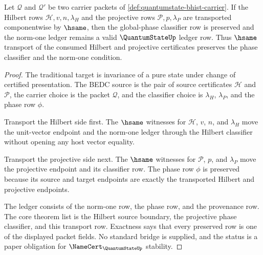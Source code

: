 \begin{theorem}
\label{thm:quantumstate-global-phase-stability}
Let $\mathcal{Q}$ and $\mathcal{Q}'$ be two carrier packets of
\autoref{def:quantumstate-bhist-carrier}. If the Hilbert rows
$\mathcal{H},v,n,\lambda_H$ and the projective rows
$\mathcal{P},p,\lambda_P$ are transported componentwise by $\hsame$, then the
global-phase classifier row is preserved and the norm-one ledger remains a
valid $\QuantumStateUp$ ledger row. Thus $\hsame$ transport of the consumed
Hilbert and projective certificates preserves the phase classifier and the
norm-one condition.
\end{theorem}
\begin{proof}
The traditional target is invariance of a pure state under change of certified
presentation. The BEDC source is the pair of source certificates
$\mathcal{H}$ and $\mathcal{P}$, the carrier choice is the packet
$\mathcal{Q}$, and the classifier choice is $\lambda_H$, $\lambda_P$, and the
phase row $\phi$.

Transport the Hilbert side first. The $\hsame$ witnesses for
$\mathcal{H}$, $v$, $n$, and $\lambda_H$ move the unit-vector endpoint and the
norm-one ledger through the Hilbert classifier without opening any host vector
equality.

Transport the projective side next. The $\hsame$ witnesses for
$\mathcal{P}$, $p$, and $\lambda_P$ move the projective endpoint and its
classifier row. The phase row $\phi$ is preserved because its source and target
endpoints are exactly the transported Hilbert and projective endpoints.

The ledger consists of the norm-one row, the phase row, and the provenance
row. The core theorem list is the Hilbert source boundary, the projective phase
classifier, and this transport row. Exactness says that every preserved row is
one of the displayed packet fields. No standard bridge is supplied, and the
status is a paper obligation for $\NameCert_{\QuantumStateUp}$ stability.
\end{proof}

